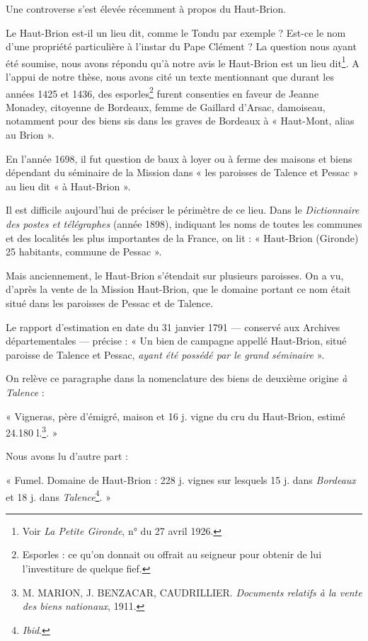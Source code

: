 \asterism{}

Une controverse s'est élevée récemment à propos du Haut-Brion.

Le Haut-Brion est-il un lieu dit, comme le Tondu par exemple ? Est-ce le nom d'une propriété particulière à l'instar du Pape Clément ? La question nous ayant été soumise, nous avons répondu qu'à notre avis le Haut-Brion est un lieu dit\footnote{Voir \textit{La Petite Gironde}, n° du 27 avril 1926.}. A l'appui de notre thèse, nous avons cité un texte mentionnant que durant les années 1425 et 1436, des esporles\footnote{Esporles : ce qu'on donnait ou offrait au seigneur pour obtenir de lui l'investiture de quelque fief.} furent consenties en faveur de Jeanne Monadey, citoyenne de Bordeaux, femme de Gaillard d'Arsac, damoiseau, notamment pour des biens sis dans les graves de Bordeaux à « Haut-Mont, alias au Brion ».

En l'année 1698, il fut question de baux à loyer ou à ferme des maisons et biens dépendant du séminaire de la Mission dans « les paroisses de Talence et Pessac » au lieu dit « à Haut-Brion ».

Il est difficile aujourd'hui de préciser le périmètre de ce lieu. Dans le \textit{Dictionnaire des postes et télégraphes} (année 1898), indiquant les noms de toutes les communes et des localités les plus importantes de la France, on lit : « Haut-Brion (Gironde) 25 habitants, commune de Pessac ».

Mais anciennement, le Haut-Brion s'étendait sur plusieurs paroisses. On a vu, d'après la vente de la Mission Haut-Brion, que le domaine portant ce nom était situé dans les paroisses de Pessac et de Talence. 

Le rapport d'estimation en date du 31 janvier 1791 — conservé aux Archives départementales — précise : « Un bien de campagne appellé Haut-Brion, situé paroisse de Talence et Pessac, \textit{ayant été possédé par le grand séminaire} ».

On relève ce paragraphe dans la nomenclature des biens de deuxième origine \textit{à Talence} :

« Vigneras, père d'émigré, maison et 16 j. vigne du cru du Haut-Brion, estimé 24.180 l.\footnote{M. MARION, J. BENZACAR, CAUDRILLIER. \textit{Documents relatifs à la vente des biens nationaux}, 1911.}. »

Nous avons lu d'autre part :

« Fumel. Domaine de Haut-Brion : 228 j. vignes sur lesquels 15 j. dans \textit{Bordeaux} et 18 j. dans \textit{Talence}\footnote{\textit{Ibid}.}. »

